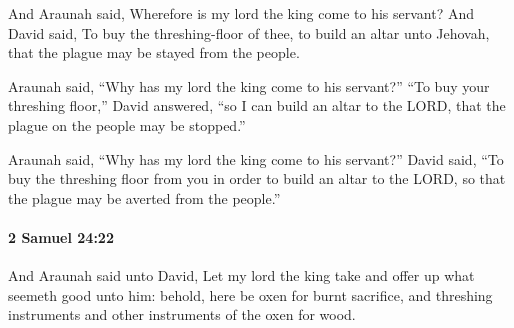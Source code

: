 			\begin{versebox}
					\item[BHS] 
					\item[ASV] And Araunah said, Wherefore is my lord the king come to his servant? And David said, To buy the threshing-floor of thee, to build an altar unto Jehovah, that the plague may be stayed from the people.
					\item[NIV] Araunah said, “Why has my lord the king come to his servant?” “To buy your threshing floor,” David answered, “so I can build an altar to the LORD, that the plague on the people may be stopped.”
					\item[NRSV] Araunah said, “Why has my lord the king come to his servant?” David said, “To buy the threshing floor from you in order to build an altar to the LORD, so that the plague may be averted from the people.”
			\end{versebox}

		\paragraph{2 Samuel 24:22} %
			\label{2SAMUEL-24-22}

			And Araunah said unto David, Let my lord the king take and offer up what seemeth good unto him: behold, here be oxen for burnt sacrifice, and threshing instruments and other instruments of the oxen for wood.

